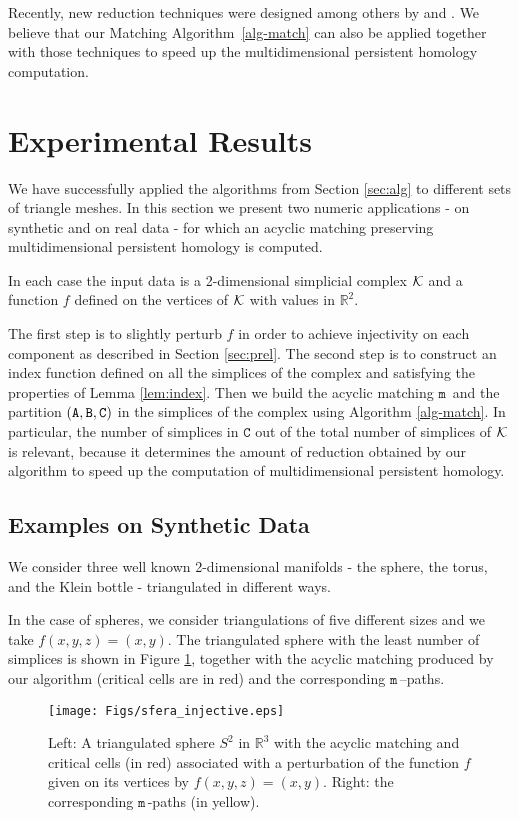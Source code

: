 \documentclass[12pt]{article}
\newcommand{\R}{{\mathbb R}}
\newcommand{\cK}{{\cal K}}
\newcommand{\ma}{\texttt{m}\,} \newcommand{\re}{\texttt{r}\,}
\newcommand{\sB}{\texttt{B}}
\newcommand{\sC}{\texttt{C}} \newcommand{\sD}{\texttt{D}} \newcommand{\sM}{\texttt{M}} \newcommand{\sL}{\texttt{L}}
\begin{document}
Recently, new reduction techniques were designed among others by \cite{DloWag} and \cite[Section C.2]{Rat15}. We believe that our Matching Algorithm~\ref{alg-match} can also be applied together with those techniques to speed up the multidimensional persistent homology computation.


\section{Experimental Results}\label{sec:experiments}

We have successfully applied the algorithms from Section \ref{sec:alg}
to different sets of triangle meshes. In this
section we present two numeric applications - on synthetic and on real data - for which
an acyclic matching preserving multidimensional persistent homology is computed.

In each case the input data is a 2-dimensional simplicial complex $\cK$  and a function $f$ defined on the vertices of $\cK$ with values in $\R^2$.

The first step is to slightly perturb $f$ in order to achieve injectivity on each component as described in Section \ref{sec:prel}. The second step is to construct an index function defined on all the simplices of the complex and satisfying the properties of Lemma \ref{lem:index}. Then we build
the acyclic matching $\ma$ and the partition $(\sA,\sB,\sC)$ in the simplices of the complex using Algorithm \ref{alg-match}. In particular, the number of simplices in $\sC$ out of the total number of simplices of $\cK$ is relevant, because it determines the amount of reduction obtained by our algorithm to speed up the computation of multidimensional persistent homology.

\subsection{Examples on Synthetic Data}

We consider three well known 2-dimensional manifolds - the sphere, the torus, and the Klein bottle - triangulated in different ways.

In the case of spheres, we consider triangulations of five different sizes and we take
$f(x,y,z)=(x,y)$. The triangulated sphere with the least number of simplices is shown in Figure \ref{fig:sphere}, together with the acyclic matching produced by our algorithm (critical cells are in red) and the corresponding $\ma$--paths.

\begin{figure}[t]
\begin{center}
\texttt{[image: Figs/sfera\_injective.eps]}
  \caption{Left: A triangulated sphere $S^2$ in $\R^3$ with the acyclic matching and  critical cells (in red)  associated with a perturbation of the function $f$ given on its vertices by $f(x,y,z)=(x,y)$. Right: the corresponding $\ma$-paths (in yellow).
 }
\end{center}
\label{fig:sphere}
\end{figure}
\end{document}

